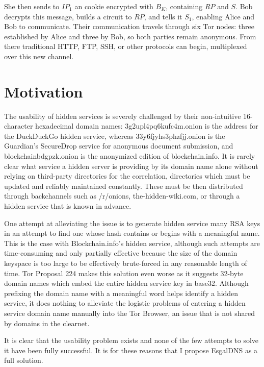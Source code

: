 She then sends to $IP_{1}$ an cookie encrypted with $B_{K}$, containing $RP$ and $S$. Bob decrypts this message, builds a circuit to $RP$, and tells it $S_{1}$, enabling Alice and Bob to communicate. Their communication travels through six Tor nodes: three established by Alice and three by Bob, so both parties remain anonymous. From there traditional HTTP, FTP, SSH, or other protocols can begin, multiplexed over this new channel.

\section{Motivation}

The usability of hidden services is severely challenged by their non-intuitive 16-character hexadecimal domain names: 3g2upl4pq6kufc4m.onion is the address for the DuckDuckGo hidden service, whereas 33y6fjyhs3phzfjj.onion is the Guardian's SecureDrop service for anonymous document submission, and blockchainbdgpzk.onion is the anonymized edition of blockchain.info. It is rarely clear what service a hidden server is providing by its domain name alone without relying on third-party directories for the correlation, directories which must be updated and reliably maintained constantly. These must be then distributed through backchannels such as /r/onions, the-hidden-wiki.com, or through a hidden service that is known in advance.

One attempt at alleviating the issue is to generate hidden service many RSA keys in an attempt to find one whose hash contains or begins with a meaningful name. This is the case with Blockchain.info's hidden service, although such attempts are time-consuming and only partially effective because the size of the domain keyspace is too large to be effectively brute-forced in any reasonable length of time. Tor Proposal 224 makes this solution even worse as it suggests 32-byte domain names which embed the entire hidden service key in base32. Although prefixing the domain name with a meaningful word helps identify a hidden service, it does nothing to alleviate the logistic problems of entering a hidden service domain name manually into the Tor Browser, an issue that is not shared by domains in the clearnet.

It is clear that the usability problem exists and none of the few attempts to solve it have been fully successful. It is for these reasons that I propose EsgalDNS as a full solution.
